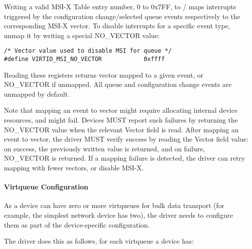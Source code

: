 Writing a valid MSI-X Table entry number, 0 to 0x7FF, to
/ maps interrupts triggered
by the configuration change/selected queue events respectively to
the corresponding MSI-X vector. To disable interrupts for a
specific event type, unmap it by writing a special NO_VECTOR
value:

\begin{lstlisting}
/* Vector value used to disable MSI for queue */
#define VIRTIO_MSI_NO_VECTOR            0xffff
\end{lstlisting}

Reading these registers returns vector mapped to a given event,
or NO_VECTOR if unmapped. All queue and configuration change
events are unmapped by default.

Note that mapping an event to vector might require allocating
internal device resources, and might fail. Devices MUST report such
failures by returning the NO_VECTOR value when the relevant
Vector field is read. After mapping an event to vector, the
driver MUST verify success by reading the Vector field value: on
success, the previously written value is returned, and on
failure, NO_VECTOR is returned. If a mapping failure is detected,
the driver can retry mapping with fewer vectors, or disable MSI-X.

\paragraph{Virtqueue Configuration}\label{sec:Virtio Transport Options / Virtio Over PCI Bus / PCI-specific Initialization And Device Operation / Device Initialization / Virtqueue Configuration}

As a device can have zero or more virtqueues for bulk data
transport (for example, the simplest network device has two), the driver
needs to configure them as part of the device-specific
configuration.

The driver does this as follows, for each virtqueue a device has:

